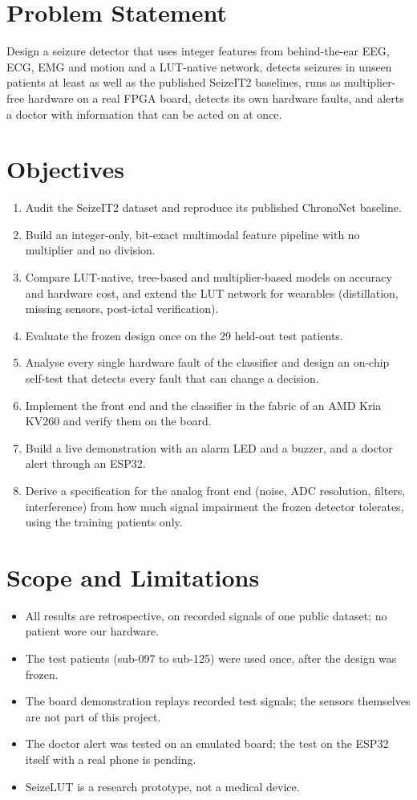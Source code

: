 \section{Problem Statement}

Design a seizure detector that uses integer features from behind-the-ear EEG, ECG, EMG and motion and a LUT-native
network, detects seizures in unseen patients at least as well as the published SeizeIT2 baselines, runs as
multiplier-free hardware on a real FPGA board, detects its own hardware faults, and alerts a doctor with information
that can be acted on at once.

\section{Objectives}

\begin{enumerate}
\item Audit the SeizeIT2 dataset and reproduce its published ChronoNet baseline.
\item Build an integer-only, bit-exact multimodal feature pipeline with no multiplier and no division.
\item Compare LUT-native, tree-based and multiplier-based models on accuracy and hardware cost, and extend the LUT
  network for wearables (distillation, missing sensors, post-ictal verification).
\item Evaluate the frozen design once on the 29 held-out test patients.
\item Analyse every single hardware fault of the classifier and design an on-chip self-test that detects every fault
  that can change a decision.
\item Implement the front end and the classifier in the fabric of an AMD Kria KV260 and verify them on the board.
\item Build a live demonstration with an alarm LED and a buzzer, and a doctor alert through an ESP32.
\item Derive a specification for the analog front end (noise, ADC resolution, filters, interference) from how much
  signal impairment the frozen detector tolerates, using the training patients only.
\end{enumerate}

\section{Scope and Limitations}

\begin{itemize}
\item All results are retrospective, on recorded signals of one public dataset; no patient wore our hardware.
\item The test patients (sub-097 to sub-125) were used once, after the design was frozen.
\item The board demonstration replays recorded test signals; the sensors themselves are not part of this project.
\item The doctor alert was tested on an emulated board; the test on the ESP32 itself with a real phone is pending.
\item SeizeLUT is a research prototype, not a medical device.
\end{itemize}
